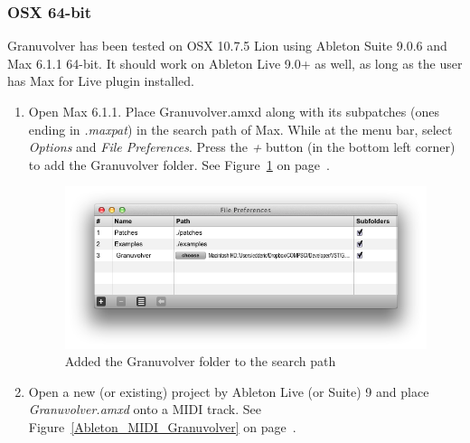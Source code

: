 \documentclass{article}
\begin{document}
			\subsubsection{OSX 64-bit}
				Granuvolver has been tested on OSX 10.7.5 Lion using Ableton Suite 9.0.6 and Max 6.1.1 64-bit. It should work on Ableton Live 9.0+ as well, as long as the user has Max for Live plugin installed. 

				\begin{enumerate}
				\item Open Max 6.1.1. Place Granuvolver.amxd along with its subpatches (ones ending in \emph{.maxpat}) in the search path of Max. While at the menu bar, select \emph{Options} and \emph{File Preferences}.  Press the \emph{+} button (in the bottom left corner) to add the Granuvolver folder. See Figure~\ref{installation_figure} on page~\pageref{installation_figure}.

				\begin{figure}[h!]
				  \centering
			    \includegraphics[width=1\textwidth]{images/Installation}
				  \caption{Added the Granuvolver folder to the search path}
				  \label{installation_figure}
				\end{figure}

				\item Open a new (or existing) project by Ableton Live (or Suite) 9 and place \emph{Granuvolver.amxd} onto a MIDI track. See Figure~\ref{Ableton_MIDI_Granuvolver} on page~\pageref{Ableton_MIDI_Granuvolver}.


\end{enumerate}
\end{document}
